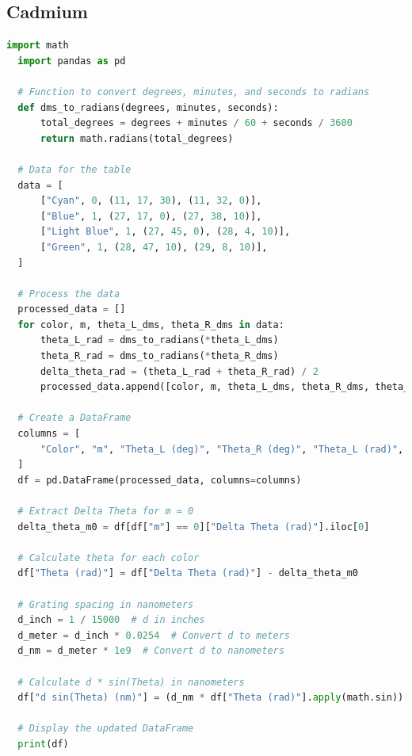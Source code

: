\documentclass[a4paper,11pt]{article}
\begin{document}
\subsection*{Cadmium}
\begin{lstlisting}[language=Python]
  import math
  import pandas as pd
  
  # Function to convert degrees, minutes, and seconds to radians
  def dms_to_radians(degrees, minutes, seconds):
      total_degrees = degrees + minutes / 60 + seconds / 3600
      return math.radians(total_degrees)
  
  # Data for the table
  data = [
      ["Cyan", 0, (11, 17, 30), (11, 32, 0)],
      ["Blue", 1, (27, 17, 0), (27, 38, 10)],
      ["Light Blue", 1, (27, 45, 0), (28, 4, 10)],
      ["Green", 1, (28, 47, 10), (29, 8, 10)],
  ]
  
  # Process the data
  processed_data = []
  for color, m, theta_L_dms, theta_R_dms in data:
      theta_L_rad = dms_to_radians(*theta_L_dms)
      theta_R_rad = dms_to_radians(*theta_R_dms)
      delta_theta_rad = (theta_L_rad + theta_R_rad) / 2
      processed_data.append([color, m, theta_L_dms, theta_R_dms, theta_L_rad, theta_R_rad, delta_theta_rad])
  
  # Create a DataFrame
  columns = [
      "Color", "m", "Theta_L (deg)", "Theta_R (deg)", "Theta_L (rad)", "Theta_R (rad)", "Delta Theta (rad)"
  ]
  df = pd.DataFrame(processed_data, columns=columns)
  
  # Extract Delta Theta for m = 0
  delta_theta_m0 = df[df["m"] == 0]["Delta Theta (rad)"].iloc[0]
  
  # Calculate theta for each color
  df["Theta (rad)"] = df["Delta Theta (rad)"] - delta_theta_m0
  
  # Grating spacing in nanometers
  d_inch = 1 / 15000  # d in inches
  d_meter = d_inch * 0.0254  # Convert d to meters
  d_nm = d_meter * 1e9  # Convert d to nanometers
  
  # Calculate d * sin(Theta) in nanometers
  df["d sin(Theta) (nm)"] = (d_nm * df["Theta (rad)"].apply(math.sin)).round(4)
  
  # Display the updated DataFrame
  print(df)
\end{lstlisting}
\end{document}
